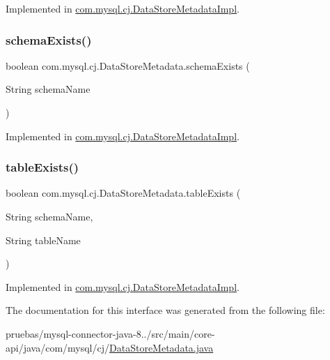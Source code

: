 Implemented in \mbox{\hyperlink{classcom_1_1mysql_1_1cj_1_1_data_store_metadata_impl_a8fc9c60e1f7bb1d72c63bdad408a511a}{com.\+mysql.\+cj.\+Data\+Store\+Metadata\+Impl}}.

\mbox{\label{interfacecom_1_1mysql_1_1cj_1_1_data_store_metadata_a84e051d687ac64b12284d1108299ddd2}} 
\subsubsection{\texorpdfstring{schema\+Exists()}{schemaExists()}}
{\footnotesize\ttfamily boolean com.\+mysql.\+cj.\+Data\+Store\+Metadata.\+schema\+Exists (\begin{DoxyParamCaption}\item[{String}]{schema\+Name }\end{DoxyParamCaption})}



Implemented in \mbox{\hyperlink{classcom_1_1mysql_1_1cj_1_1_data_store_metadata_impl_a56f0ee01f926da85fa6c7e692abd8ba1}{com.\+mysql.\+cj.\+Data\+Store\+Metadata\+Impl}}.

\mbox{\label{interfacecom_1_1mysql_1_1cj_1_1_data_store_metadata_aa5f40f6700b0a10a53ef81b8481b34be}} 
\subsubsection{\texorpdfstring{table\+Exists()}{tableExists()}}
{\footnotesize\ttfamily boolean com.\+mysql.\+cj.\+Data\+Store\+Metadata.\+table\+Exists (\begin{DoxyParamCaption}\item[{String}]{schema\+Name,  }\item[{String}]{table\+Name }\end{DoxyParamCaption})}



Implemented in \mbox{\hyperlink{classcom_1_1mysql_1_1cj_1_1_data_store_metadata_impl_a4e68791d006063644a74604988f41c23}{com.\+mysql.\+cj.\+Data\+Store\+Metadata\+Impl}}.



The documentation for this interface was generated from the following file\+:\begin{DoxyCompactItemize}
\item 
pruebas/mysql-\/connector-\/java-\/8../src/main/core-\/api/java/com/mysql/cj/\mbox{\hyperlink{_data_store_metadata_8java}{Data\+Store\+Metadata.\+java}}\end{DoxyCompactItemize}

